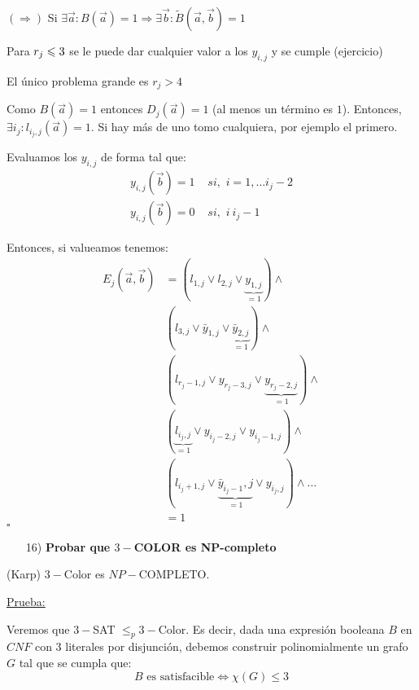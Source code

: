 \documentclass[12pt,a4paper]{article}
\begin{document}
$(\Rightarrow)$ Si $\exists \overrightarrow{a} : B(\overrightarrow{a}) = 1 \Rightarrow \exists \overrightarrow{b} : \widetilde{B}(\overrightarrow{a},\overrightarrow{b}) = 1$
\medskip

Para $r_{j} \leqslant 3$ se le puede dar cualquier valor a los $y_{i,j}$ y se cumple (ejercicio)
\medskip

El único problema grande es $r_{j} > 4$
\medskip

Como $B(\overrightarrow{a}) = 1$ entonces $D_{j}(\overrightarrow{a}) = 1$ (al menos 
un término es $1$). Entonces, $\exists i_{j} : l_{i_{j},j}(\overrightarrow{a}) = 1$.
Si hay más de uno tomo cualquiera, por ejemplo el primero.
\medskip

Evaluamos los $y_{i,j}$ de forma tal que:
\begin{align*}
    y_{i,j}(\overrightarrow{b}) = 1 &\,\, si,\,\, i = 1,\ldots i_{j}-2 \\
    y_{i,j}(\overrightarrow{b}) = 0 &\,\, si,\,\, i \> i_{j}-1
\end{align*}

Entonces, si valueamos tenemos:
\begin{align*}
    E_{j}(\overrightarrow{a},\overrightarrow{b}) &= (l_{1,j} \vee l_{2,j} \vee \underbrace{y_{1,j}}_{=1}) \wedge \\
    & (l_{3,j} \vee \bar{y}_{1,j} \vee \underbrace{\bar{y}_{2,j}}_{=1}) \wedge \\
    & (l_{r_{j}-1,j} \vee y_{r_{j}-3,j} \vee \underbrace{y_{r_{j}-2,j}}_{=1}) \wedge \\
    & (\underbrace{l_{i_{j},j}}_{=1} \vee y_{i_{j}-2,j} \vee y_{i_{j}-1,j}) \wedge \\
    & (l_{i_{j}+1,j} \vee \underbrace{\bar{y}_{i_{j}-1},j}_{=1} \vee y_{i_{j},j}) \wedge \ldots \\
    &= 1
\end{align*}
$\square$

\begin{itemize}
    \item [16)] \textbf{Probar que $3-$COLOR es NP-completo}
    \label{dem:3color}
\end{itemize}

\begin{teorema} (Karp) $3-$Color es $NP-$COMPLETO.
\end{teorema}

\underline{Prueba:}
\medskip

Veremos que $3-$SAT $\leq_{p} 3-$Color. Es decir, dada una expresión booleana $B$ 
en $CNF$ con $3$ literales por disjunción, debemos construir polinomialmente un grafo 
$G$ tal que se cumpla que:
$$B \text{ es satisfacible} \Leftrightarrow \chi (G) \leq 3$$ 
\end{document}
